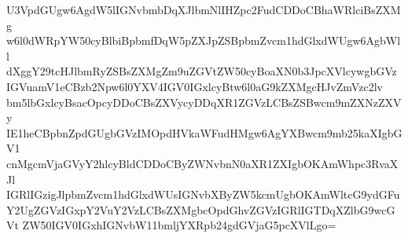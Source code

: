 U3VpdGUgw6AgdW5lIGNvbmbDqXJlbmNlIHZpc2FudCDDoCBhaWRlciBsZXMg
w6l0dWRpYW50cyBlbiBpbmfDqW5pZXJpZSBpbmZvcm1hdGlxdWUgw6AgbWll
dXggY29tcHJlbmRyZSBsZXMgZm9uZGVtZW50cyBoaXN0b3JpcXVlcywgbGVz
IGVuamV1eCBzb2Npw6l0YXV4IGV0IGxlcyBtw6l0aG9kZXMgcHJvZmVzc2lv
bm5lbGxlcyBsacOpcyDDoCBsZXVycyDDqXR1ZGVzLCBsZSBwcm9mZXNzZXVy
IE1heCBpbnZpdGUgbGVzIMOpdHVkaWFudHMgw6AgYXBwcm9mb25kaXIgbGV1
cnMgcmVjaGVyY2hlcyBldCDDoCByZWNvbnN0aXR1ZXIgbOKAmWhpc3RvaXJl
IGRlIGzigJlpbmZvcm1hdGlxdWUsIGNvbXByZW5kcmUgbOKAmWltcG9ydGFu
Y2UgZGVzIGxpY2VuY2VzLCBsZXMgbcOpdGhvZGVzIGRlIGTDqXZlbG9wcGVt
ZW50IGV0IGxhIGNvbW11bmljYXRpb24gdGVjaG5pcXVlLgo=

